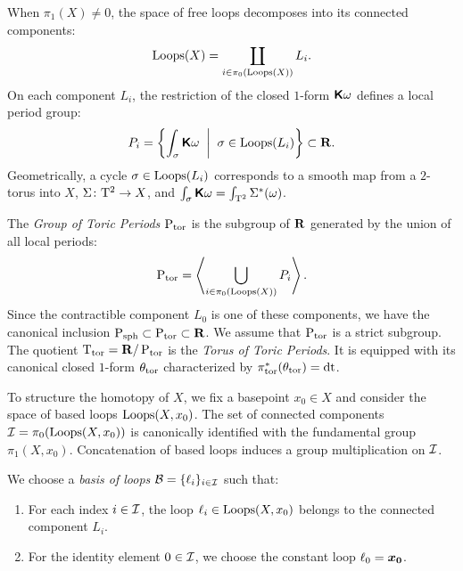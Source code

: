 \documentclass[11pt,reqno,letterpaper,twoside]{amsart}
\begin{document}
  \begin{article}
    \label{art:The Toric Periods}
    
    When $\pi_1(X) \neq 0$,
    the space of free loops decomposes into its connected components:
    \[
      \operatorname{Loops}(X) = \coprod_{i \in \pi_0(\operatorname{Loops}(X))} L_i.
      \]
    On each component $L_i$,
    the restriction of the closed $1$-form $\boldsymbol{\mathsf{K}}\omega$ defines a local period group:
    \[
      P_i = \left\{ \int_\sigma \boldsymbol{\mathsf{K}}\omega \;\;\bigg|\;\; \sigma \in \operatorname{Loops}(L_i) \right\} \subset {\mathbf{R}}.
      \]
    Geometrically,
    a cycle $\sigma \in \operatorname{Loops}(L_i)$ corresponds to a smooth map from a $2$-torus into $X$,
    $\Sigma \colon \mathrm{T}^2 \to X$,
    and $\int_\sigma \boldsymbol{\mathsf{K}}\omega = \int_{\mathrm{T}^2} \Sigma^*(\omega)$.
    
    The \emph{Group of Toric Periods} $\operatorname{P}_{\mathrm{tor}}$ is the subgroup of ${\mathbf{R}}$ generated by the union of all local periods:
    \[
      \operatorname{P}_{\mathrm{tor}} = \left\langle \bigcup_{i \in \pi_0(\operatorname{Loops}(X))} P_i \right\rangle.
      \]
    Since the contractible component $L_0$ is one of these components,
    we have the canonical inclusion $\operatorname{P}_{\mathrm{sph}} \subset \operatorname{P}_{\mathrm{tor}} \subset {\mathbf{R}}$.
    We assume that $\operatorname{P}_{\mathrm{tor}}$ is a strict subgroup.
    The quotient $\mathrm{T}_{\mathrm{tor}} = {\mathbf{R}}/\operatorname{P}_{\mathrm{tor}}$
    is the \emph{Torus of Toric Periods}.
    It is equipped with its canonical closed $1$-form $\theta_{\mathrm{tor}}$ characterized by $\pi_{\mathrm{tor}}^*(\theta_{\mathrm{tor}}) = \mathrm{dt}$.
  \end{article}
  
  \begin{article}
    \label{art:The Group of Indices}
    
    To structure the homotopy of $X$,
    we fix a basepoint $x_0 \in X$ and consider the space of based loops $\operatorname{Loops}(X, x_0)$.
    The set of connected components $\mathcal{I} = \pi_0(\operatorname{Loops}(X, x_0))$ is canonically identified with the fundamental group $\pi_1(X, x_0)$.
    Concatenation of based loops induces a group multiplication on $\mathcal{I}$.
    
    We choose a \emph{basis of loops} $\mathcal{B} = \{ \ell_i \}_{i \in \mathcal{I}}$ such that:
    \begin{enumerate}
      \item For each index $i \in \mathcal{I}$,
      the loop $\ell_i \in \operatorname{Loops}(X, x_0)$ belongs to the connected component $L_i$.
      \item For the identity element $0 \in \mathcal{I}$,
      we choose the constant loop $\ell_0 = \boldsymbol{x_0}$.
    \end{enumerate}
  \end{article}
  
\end{document}
